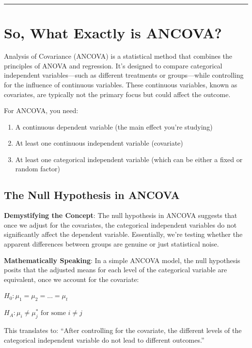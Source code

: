 \documentclass[
  letterpaper,
  DIV=11,
  numbers=noendperiod]{scrreprt}
\providecommand{\tightlist}{%
  \setlength{\itemsep}{0pt}\setlength{\parskip}{0pt}}\usepackage{longtable,booktabs,array}
\begin{document}
\begin{center}\rule{0.5\linewidth}{0.5pt}\end{center}

\section{So, What Exactly is ANCOVA?}\label{so-what-exactly-is-ancova}

Analysis of Covariance (ANCOVA) is a statistical method that combines
the principles of ANOVA and regression. It's designed to compare
categorical independent variables---such as different treatments or
groups---while controlling for the influence of continuous variables.
These continuous variables, known as covariates, are typically not the
primary focus but could affect the outcome.

For ANCOVA, you need:

\begin{enumerate}
\def\labelenumi{\arabic{enumi})}
\tightlist
\item
  A continuous dependent variable (the main effect you're studying)
\item
  At least one continuous independent variable (covariate)
\item
  At least one categorical independent variable (which can be either a
  fixed or random factor)
\end{enumerate}

\subsection{The Null Hypothesis in
ANCOVA}\label{the-null-hypothesis-in-ancova}

\textbf{Demystifying the Concept}: The null hypothesis in ANCOVA
suggests that once we adjust for the covariates, the categorical
independent variables do not significantly affect the dependent
variable. Essentially, we're testing whether the apparent differences
between groups are genuine or just statistical noise.

\textbf{Mathematically Speaking}: In a simple ANCOVA model, the null
hypothesis posits that the adjusted means for each level of the
categorical variable are equivalent, once we account for the covariate:

\(H_0: \mu_1 = \mu_2 = \ldots = \mu_t\)

\(H_A: \mu_i \neq \mu_j^* \text{ for some } i \neq j\)

This translates to: ``After controlling for the covariate, the different
levels of the categorical independent variable do not lead to different
outcomes.''
\end{document}
